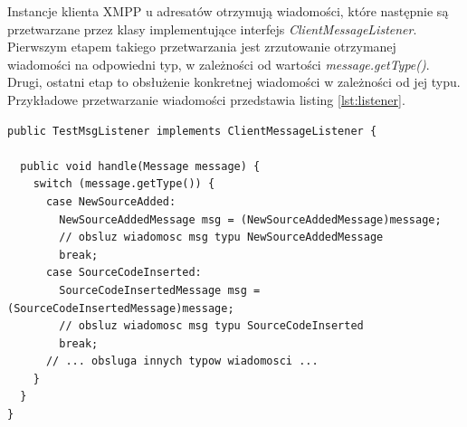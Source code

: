 \documentclass[polish,11pt,a4paper,twoside]{article}
\begin{document}
Instancje klienta XMPP u adresatów otrzymują wiadomości, które następnie są przetwarzane przez klasy implementujące interfejs \emph{ClientMessageListener}. Pierwszym etapem takiego przetwarzania jest zrzutowanie otrzymanej wiadomości na odpowiedni typ, w zależności od wartości \emph{message.getType()}. Drugi, ostatni etap to obsłużenie konkretnej wiadomości w zależności od jej typu. Przykładowe przetwarzanie wiadomości przedstawia listing \ref{lst:listener}.

\begin{lstlisting}[label=lst:listener,caption=Przykład obsługi otrzymywanych wiadomości po stronie klienta XMPP]
public TestMsgListener implements ClientMessageListener {

  public void handle(Message message) {
    switch (message.getType()) {
      case NewSourceAdded:
        NewSourceAddedMessage msg = (NewSourceAddedMessage)message;
        // obsluz wiadomosc msg typu NewSourceAddedMessage
        break;
      case SourceCodeInserted:
        SourceCodeInsertedMessage msg = (SourceCodeInsertedMessage)message;
        // obsluz wiadomosc msg typu SourceCodeInserted
        break;
      // ... obsluga innych typow wiadomosci ...
    }
  }
}
\end{lstlisting}
\end{document}

